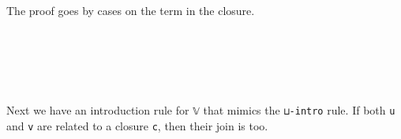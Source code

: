 The proof goes by cases on the term in the closure.

\begin{fence}
\begin{code}%
\>[0]%
\>[759I]\AgdaSymbol{:}\AgdaSpace{}%
\AgdaSymbol{\}\{}\AgdaSpace{}%
\AgdaSymbol{:}\AgdaSpace{}%
\AgdaSpace{}%
\AgdaSymbol{\}\{}\AgdaSpace{}%
\AgdaSymbol{:}\AgdaSpace{}%
\AgdaSpace{}%
\AgdaSpace{}%
\AgdaSymbol{\}\{}\AgdaSymbol{\}}\<%
\\
\>[.][@{}l@{}]\<[759I]%
\>[7]\AgdaSpace{}%
\AgdaSpace{}%
\AgdaSpace{}%
\AgdaSymbol{(}\AgdaSpace{}%
\AgdaSpace{}%
\AgdaSymbol{)}\AgdaSpace{}%
\AgdaSpace{}%
\AgdaSpace{}%
\<%
\\
\>[0]\AgdaSpace{}%
\AgdaSymbol{\{}\AgdaSpace{}%
\AgdaSymbol{=}\AgdaSpace{}%
\AgdaSpace{}%
\AgdaSymbol{\}}\AgdaSpace{}%
\AgdaSymbol{\{}\AgdaSymbol{\}}\AgdaSpace{}%
\AgdaSymbol{()}\<%
\\
\>[0]\AgdaSpace{}%
\AgdaSymbol{\{}\AgdaSpace{}%
\AgdaSymbol{=}\AgdaSpace{}%
\AgdaSpace{}%
\AgdaSymbol{\}}\AgdaSpace{}%
\AgdaSymbol{\{}\AgdaSymbol{\}}\AgdaSpace{}%
\AgdaSpace{}%
\AgdaSymbol{=}\AgdaSpace{}%
\<%
\\
\>[0]\AgdaSpace{}%
\AgdaSymbol{\{}\AgdaSpace{}%
\AgdaSymbol{=}\AgdaSpace{}%
\AgdaSpace{}%
\AgdaSpace{}%
\AgdaSymbol{\}}\AgdaSpace{}%
\AgdaSymbol{\{}\AgdaSymbol{\}}\AgdaSpace{}%
\AgdaSymbol{()}\<%
\end{code}
\end{fence}

Next we have an introduction rule for \texttt{𝕍} that mimics the
\texttt{⊔-intro} rule. If both \texttt{u} and \texttt{v} are related to
a closure \texttt{c}, then their join is too.

